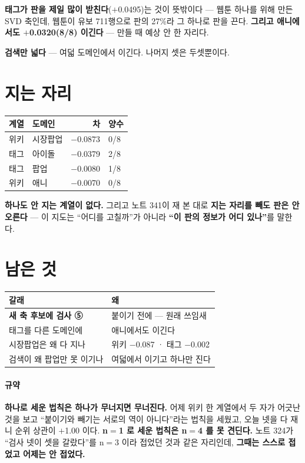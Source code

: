 \documentclass[10pt]{article}
\begin{document}
\textbf{태그가 판을 제일 많이 받친다}($+$0.0495)는 것이 뜻밖이다 ---
웹툰 하나를 위해 만든 SVD 축인데, 웹툰이 유보 711행으로 판의 27\%라
그 하나로 판을 끈다. \textbf{그리고 애니에서도 $+$0.0320(8/8) 이긴다}
--- 만들 때 예상 안 한 자리다.

\textbf{검색만 넓다} --- 여덟 도메인에서 이긴다. 나머지 셋은 두셋뿐이다.

\section{지는 자리}

\begin{center}\footnotesize
\begin{tabular}{llrl}
\hline
계열 & 도메인 & 차 & 양수 \\
\hline
위키 & 시장팝업 & $-$0.0873 & 0/8 \\
태그 & 아이돌 & $-$0.0379 & 2/8 \\
태그 & 팝업 & $-$0.0080 & 1/8 \\
위키 & 애니 & $-$0.0070 & 0/8 \\
\hline
\end{tabular}
\end{center}

\textbf{하나도 안 지는 계열이 없다.} 그리고 노트 341이 재 본 대로
\textbf{지는 자리를 빼도 판은 안 오른다} --- 이 지도는 ``어디를 고칠까''가
아니라 \textbf{``이 판의 정보가 어디 있나''}를 말한다.

\section{남은 것}
\begin{center}\footnotesize
\begin{tabular}{ll}
\hline
갈래 & 왜 \\
\hline
\textbf{새 축 후보에 검사 ⑤} & 붙이기 전에 --- 원래 쓰임새 \\
태그를 다른 도메인에 & 애니에서도 이긴다 \\
시장팝업은 왜 다 지나 & 위키 $-$0.087 · 태그 $-$0.002 \\
검색이 왜 팝업만 못 이기나 & 여덟에서 이기고 하나만 진다 \\
\hline
\end{tabular}
\end{center}

\paragraph{규약} \textbf{하나로 세운 법칙은 하나가 무너지면 무너진다.}
어제 위키 한 계열에서 두 자가 어긋난 것을 보고 ``붙이기와 빼기는 서로의
역이 아니다''라는 법칙을 세웠고, 오늘 넷을 다 재니 순위 상관이 $+$1.00
이다. \textbf{n$=$1 로 세운 법칙은 n$=$4 를 못 견딘다.} 노트 324가
``검사 넷이 셋을 갈랐다''를 n$=$3 이라 접었던 것과 같은 자리인데,
\textbf{그때는 스스로 접었고 어제는 안 접었다.}
\end{document}
